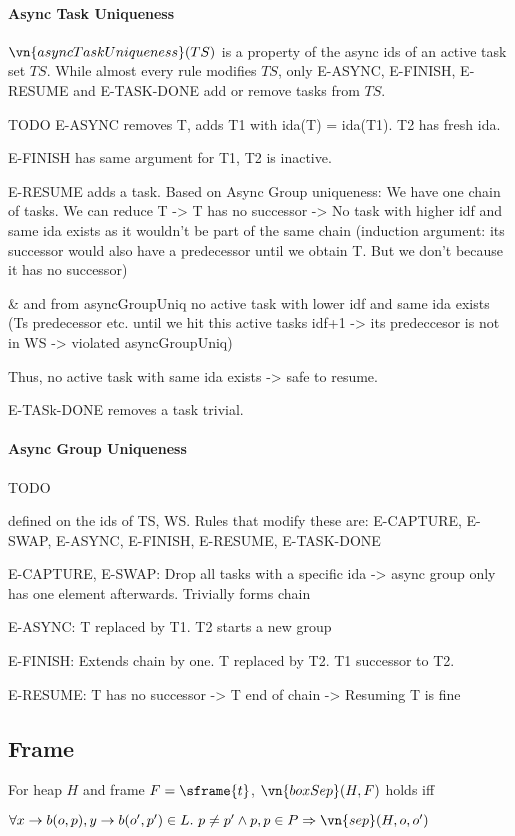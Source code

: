 \paragraph{Async Task Uniqueness}
$\vn{asyncTaskUniqueness}(TS)$ is a property of the async ids of an active task set $TS$. While almost every rule modifies $TS$, only E-ASYNC, E-FINISH, E-RESUME and E-TASK-DONE add or remove tasks from $TS$.

TODO E-ASYNC removes T, adds T1 with ida(T) = ida(T1). T2 has fresh ida.

E-FINISH has same argument for T1, T2 is inactive.

E-RESUME adds a task. Based on Async Group uniqueness: We have one chain of tasks.
We can reduce T -> T has no successor -> No task with higher idf and same ida exists as it wouldn't be part of the same chain (induction argument: its successor would also have a predecessor until we obtain T. But we don't because it has no successor)

\& and from asyncGroupUniq no active task with lower idf and same ida exists (Ts predecessor etc. until we hit this active tasks idf+1 -> its predeccesor is not in WS -> violated asyncGroupUniq)

Thus, no active task with same ida exists -> safe to resume.

E-TASk-DONE removes a task trivial.

\paragraph{Async Group Uniqueness}
TODO

defined on the ids of TS, WS. Rules that modify these are: E-CAPTURE, E-SWAP, E-ASYNC, E-FINISH, E-RESUME, E-TASK-DONE

E-CAPTURE, E-SWAP: Drop all tasks with a specific ida -> async group only has one element afterwards. Trivially forms chain

E-ASYNC: T replaced by T1. T2 starts a new group

E-FINISH: Extends chain by one. T replaced by T2. T1 successor to T2.

E-RESUME: T has no successor -> T end of chain -> Resuming T is fine









    

\subsection{Frame}
\begin{definition}
    For heap $H$ and frame $F = \sframe{t}$, $\vn{boxSep}(H, F)$ holds iff

    $\forall x \rightarrow b(o,p), y \rightarrow b(o', p') \in L.\ p \neq p' \wedge p, p \in P \Rightarrow \vn{sep}(H, o, o')$
\end{definition}

